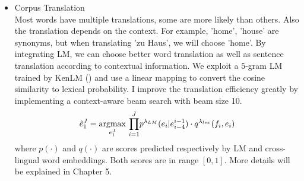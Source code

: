 \begin{itemize}
	\item Corpus Translation\\
	Most words have multiple translations, some are more likely than others. Also the translation depends on the context. For example, 'home', 'house' are synonyms, but when translating 'zu Haus', we will choose 'home'. By integrating LM, we can choose better word translation as well as sentence translation according to contextual information. We exploit a $5$-gram LM trained by KenLM (\cite{heafield2011kenlm}) and use a linear mapping to convert the cosine similarity to lexical probability. I improve the translation efficiency greatly by implementing a context-aware beam search with beam size 10. 
		\[ \hat{e}_1^J = \underset{e_1^J}{\operatorname{argmax}}{\ \prod_{i=1}^{J}} {p^{\lambda_{LM}}(e_i|e_{i-4}^{i-1}) \cdot q^{\lambda_{lex}}(f_i,e_i)}\]
		where $p(\cdot)$ and $q(\cdot)$ are scores predicted respectively by LM and cross-lingual word embeddings. Both scores are in range $[0,1]$. 
	More details will be explained in Chapter 5.
	




\end{itemize}
